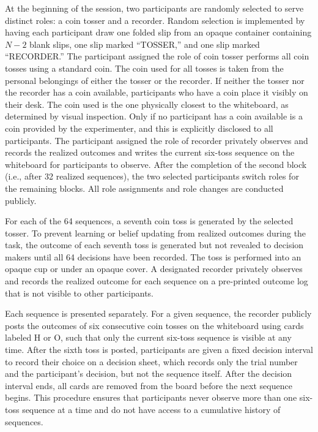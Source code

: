 \documentclass[11pt,a4paper]{article}
\numberwithin{equation}{section}
\begin{document}
At the beginning of the session, two participants are randomly selected to serve distinct roles: a coin tosser and a recorder. Random selection is implemented by having each participant draw one folded slip from an opaque container containing $N-2$ blank slips, one slip marked ``TOSSER,'' and one slip marked ``RECORDER.'' The participant assigned the role of coin tosser performs all coin tosses using a standard coin. 
The coin used for all tosses is taken from the personal belongings of either the tosser or the recorder.
If neither the tosser nor the recorder has a coin available, participants who have a coin place it visibly on their desk. The coin used is the one physically closest to the whiteboard, as determined by visual inspection.
Only if no participant has a coin available is a coin provided by the experimenter, and this is explicitly disclosed to all participants.
The participant assigned the role of recorder privately observes and records the realized outcomes and writes the current six-toss sequence on the whiteboard for participants to observe. After the completion of the second block (i.e., after 32 realized sequences), the two selected participants switch roles for the remaining blocks. All role assignments and role changes are conducted publicly.

For each of the 64 sequences, a seventh coin toss is generated by the selected tosser. To prevent learning or belief updating from realized outcomes during the task, the outcome of each seventh toss is generated but not revealed to decision makers until all 64 decisions have been recorded. The toss is performed into an opaque cup or under an opaque cover. A designated recorder privately observes and records the realized outcome for each sequence on a pre-printed outcome log that is not visible to other participants.

Each sequence is presented separately. For a given sequence, the recorder publicly posts the outcomes of six consecutive coin tosses on the whiteboard using cards labeled H or O, such that only the current six-toss sequence is visible at any time. After the sixth toss is posted, participants are given a fixed decision interval to record their choice on a decision sheet, which records only the trial number and the participant's decision, but not the sequence itself. After the decision interval ends, all cards are removed from the board before the next sequence begins. This procedure ensures that participants never observe more than one six-toss sequence at a time and do not have access to a cumulative history of sequences.
\end{document}
